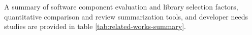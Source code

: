 


A summary of software component evaluation and library selection factors, quantitative comparison and review summarization tools, and developer needs studies are provided in table \ref{tab:related-works-summary}.